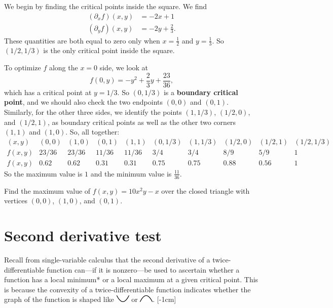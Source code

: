 \documentclass{watsonbook}
\begin{document}
  \begin{solution}
    We begin by finding the critical points inside the square. We find
    \begin{align*}
      (\partial_xf)(x,y) &= -2x + 1  \\
      (\partial_yf)(x,y) &= -2y + \frac{2}{3}. 
    \end{align*}
    These quantities are both equal to zero only when $x =
    \tfrac{1}{2}$ and $y = \frac{1}{3}$. So $(1/2,1/3)$ is the only critical
    point inside the square.

    To optimize $f$ along the $x = 0$ side, we look at
    \[
      f(0,y) = -y^2 + \frac{2}{3}y + \frac{23}{36}, 
    \]
    which has a critical point at $y = 1/3$. So $(0,1/3)$ is a
    \textbf{boundary critical point}, and we should also check the two
    endpoints $(0,0)$ and $(0,1)$. Similarly, for the other three
    sides, we identify the points $(1,1/3)$, $(1/2,0)$, and $(1/2,1)$, as
    boundary critical points as well as the other two corners $(1,1)$
    and $(1,0)$. So, all together:
    \[
      \renewcommand\arraystretch{1.4}
      \begin{array}{c|ccccccccc}
       (x,y) &  (0,0) & (1,0) & (0,1) & (1,1) & (0,1/3) & (1,1/3) & (1/2,0) &
                                                                      (1/2,1)
        & (1/2,1/3) \\ \hline
        f(x,y) & 23/36 & 23/36 & 11/36 & 11/36 & 3/4 & 3/4 & 8/9 & 5/9
        & 1 \\
        f(x,y) & 0.62 & 0.62 & 0.31 & 0.31 & 0.75 & 0.75 & 0.88 & 0.56
        & 1
      \end{array}
    \]
    So the maximum value is $\boxed{1}$ and the minimum value is
    $\boxed{\tfrac{11}{36}}$. 
  \end{solution}

  \begin{exercise}{}{}
    Find the maximum value of $f(x,y) = 10x^2y-x$ over the closed
    triangle with vertices $(0,0)$, $(1,0)$, and $(0,1)$.
  \end{exercise}

  \section{Second derivative test} \label{sec:second_test}

  Recall from single-variable calculus that the second derivative of a
  twice-differentiable function can---if it is nonzero---be used to
  ascertain whether a function has a local minimum* or a local maximum
  at a given critical point. This is because the convexity of a
  twice-differentiable function indicates whether the graph of the
  function is shaped like \includegraphics{figures/smallup} or
  \includegraphics{figures/smalldown}. [-1cm]
\end{document}
